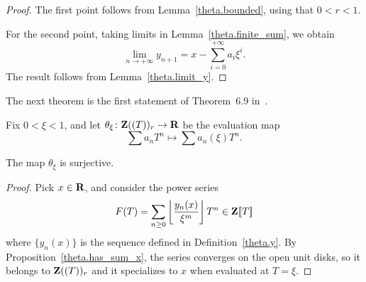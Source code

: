 \begin{proof} 
  \leanok
  The first point follows from Lemma~\ref{theta.bounded}, using that $0<r<1$.

  For the second point, taking limits in Lemma~\ref{theta.finite_sum}, we obtain
  \[
    \lim_{n\to +\infty}y_{n+1}=x-\sum_{i=0}^{+\infty}a_i\xi^i.
  \]
  The result follows from Lemma~\ref{theta.limit_y}.
\end{proof}

The next theorem is the first statement of Theorem~6.9 in~\cite{Analytic}.

\begin{definition}
  \label{theta}
  \leanok
  Fix $0<\xi <1$, and let $\theta_{\xi}\colon \mathbf{Z}((T))_r\rightarrow \mathbf{R}$ be the evaluation map
  \[
    \sum a_nT^n\longmapsto \sum a_n(\xi)T^n.
  \]
\end{definition}

\begin{theorem}
  \label{theta.surjective}
  \leanok
  The map $\theta_{\xi}$ is surjective.
\end{theorem}

\begin{proof}
  \leanok
  Pick $x\in \mathbf{R}$, and consider the power series
  \[
    F(T)=\sum_{n\geq 0}\left\lfloor \frac{y_n(x)}{\xi^m}\right\rfloor T^n\in\mathbf{Z}[\![T]\!]
  \]
  where $\{y_n(x)\}$ is the sequence defined in Definition~\ref{theta.y}.
  By Proposition~\ref{theta.has_sum_x}, the series converges on the open unit disks,
  so it belongs to $\mathbf{Z}((T))_r$ and it specializes to $x$ when evaluated at $T=\xi$.
\end{proof}

